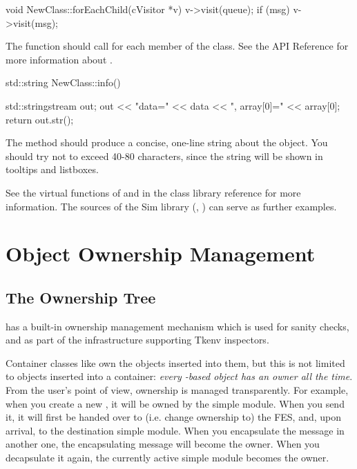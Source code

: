 \begin{cpp}
void NewClass::forEachChild(cVisitor *v)
{
    v->visit(queue);
    if (msg)
        v->visit(msg);
}
\end{cpp}

The  function should call 
for each  member of the class. See the API Reference for more
information about .

\begin{cpp}
std::string NewClass::info()
{
    std::stringstream out;
    out << "data=" << data << ", array[0]=" << array[0];
    return out.str();

}
\end{cpp}

The  method should produce a concise, one-line string
about the object. You should try not to exceed 40-80 characters, since the
string will be shown in tooltips and listboxes.

See the virtual functions of  and 
in the class library reference for more information. The sources of the
Sim library (, ) can serve as further examples.



\section{Object Ownership Management}
\label{sec:ch-sim-lib:ownership-management}

\subsection{The Ownership Tree}

{\opp} has a built-in ownership management mechanism which
is used for sanity checks, and as part of the infrastructure
supporting Tkenv inspectors.

Container classes like  own the objects inserted
into them, but this is not limited to objects inserted into a container:
\textit{every -based object has an owner all the time}.
From the user's point of view, ownership is managed transparently.
For example, when you create a new ,
it will be owned by the simple module. When you send it, it will
first be handed over to (i.e. change ownership to) the FES, and,
upon arrival, to the destination simple module. When you encapsulate
the message in another one, the encapsulating message will become
the owner. When you decapsulate it again, the currently active
simple module becomes the owner.

